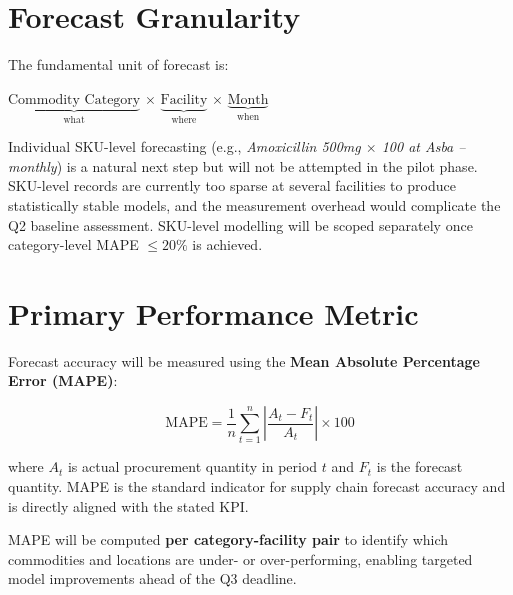 \documentclass[12pt, a4paper]{article}
\begin{document}
\section{Forecast Granularity}

The fundamental unit of forecast is:

\begin{mdframed}[style=keybox]
\begin{center}
  \large $\underbrace{\text{Commodity Category}}_{\text{what}}$
  \quad $\times$ \quad
  $\underbrace{\text{Facility}}_{\text{where}}$
  \quad $\times$ \quad
  $\underbrace{\text{Month}}_{\text{when}}$
\end{center}
\end{mdframed}

\vspace{0.8em}

Individual SKU-level forecasting (e.g., \textit{Amoxicillin 500mg $\times$ 100
at Asba -- monthly}) is a natural next step but will not be attempted in the
pilot phase. SKU-level records are currently too sparse at several facilities
to produce statistically stable models, and the measurement overhead would
complicate the Q2 baseline assessment. SKU-level modelling will be scoped
separately once category-level MAPE $\leq 20\%$ is achieved.

\section{Primary Performance Metric}

Forecast accuracy will be measured using the \textbf{Mean Absolute Percentage
Error (MAPE)}:

\[
  \text{MAPE} = \frac{1}{n} \sum_{t=1}^{n}
  \left| \frac{A_t - F_t}{A_t} \right| \times 100
\]

where $A_t$ is actual procurement quantity in period $t$ and $F_t$ is the
forecast quantity. MAPE is the standard indicator for supply chain forecast
accuracy and is directly aligned with the stated KPI.

MAPE will be computed \textbf{per category-facility pair} to identify which
commodities and locations are under- or over-performing, enabling targeted
model improvements ahead of the Q3 deadline.
\end{document}
